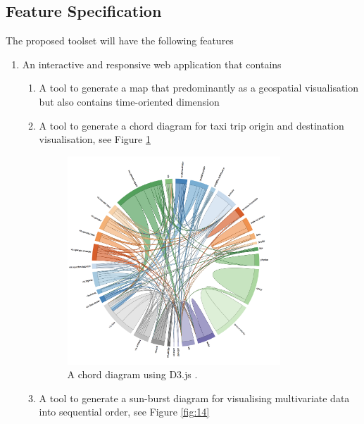 \documentclass[doc,natbib]{apa6}
\begin{document}
\subsection{Feature Specification}
The proposed toolset will have the following features
\begin{enumerate}
	\item An interactive and responsive web application that contains
	\begin{enumerate}
	\item A tool to generate a map that predominantly as a geospatial visualisation but also contains time-oriented dimension
	\item A tool to generate a chord diagram for taxi trip origin and destination visualisation, see Figure \ref{fig:13}

\begin{figure}[H]
	\centering
	\includegraphics[width=8cm,keepaspectratio]{figures/fig13.png}
	\caption{\label{fig:13}A chord diagram using D3.js \citep{Bostock2017}.}
\end{figure}
	
	\item A tool to generate a sun-burst diagram for visualising multivariate data into sequential order, see Figure \ref{fig:14}


\end{enumerate}
\end{enumerate}
\end{document}
